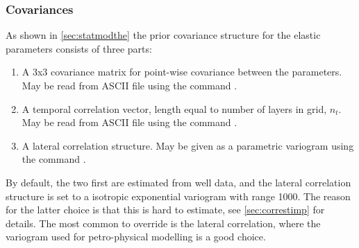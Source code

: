 \subsubsection{Covariances}
\label{sec:basiccorr}
As shown in \autoref{sec:statmodthe} the prior covariance structure for the elastic parameters consists of three parts:
\begin{enumerate}
\item A 3x3 covariance matrix for point-wise covariance between the parameters. May be read from ASCII file using the command .
\item A temporal correlation vector, length equal to number of layers in grid, $n_t$. May be read from ASCII file using the command .
\item A lateral correlation structure. May be given as a parametric variogram using the command .
\end{enumerate}
By default, the two first are estimated from well data, and the lateral correlation structure is set to a isotropic exponential variogram with range 1000. The reason for the latter choice is that this is hard to estimate, see \autoref{sec:correstimp} for details. The most common to override is the lateral correlation, where the variogram used for petro-physical modelling is a good choice.

